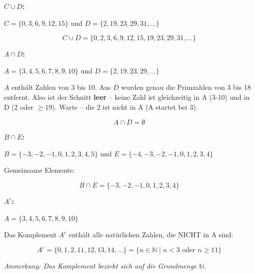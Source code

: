 \documentclass[12pt, a4paper]{article}
\begin{document}
\bigskip

\textbf{$C \cup D$:}

$C = \{0, 3, 6, 9, 12, 15\}$ und $D = \{2, 19, 23, 29, 31, \ldots\}$

\[
    \boxed{C \cup D = \{0, 2, 3, 6, 9, 12, 15, 19, 23, 29, 31, \ldots\}}
\]

\bigskip

\textbf{$A \cap D$:}

$A = \{3, 4, 5, 6, 7, 8, 9, 10\}$ und $D = \{2, 19, 23, 29, \ldots\}$

$A$ enthält Zahlen von 3 bis 10. Aus $D$ wurden genau die Primzahlen von 3 bis 18 entfernt. Also ist der Schnitt \textbf{leer} -- keine Zahl ist gleichzeitig in A (3-10) und in D (2 oder $\geq 19$). Warte -- die 2 ist nicht in A (A startet bei 3).

\[
    \boxed{A \cap D = \emptyset}
\]

\bigskip

\textbf{$B \cap E$:}

$B = \{-3, -2, -1, 0, 1, 2, 3, 4, 5\}$ und $E = \{-4, -3, -2, -1, 0, 1, 2, 3, 4\}$

Gemeinsame Elemente:

\[
    \boxed{B \cap E = \{-3, -2, -1, 0, 1, 2, 3, 4\}}
\]

\bigskip

\textbf{$A^c$:}

$A = \{3, 4, 5, 6, 7, 8, 9, 10\}$

Das Komplement $A^c$ enthält alle natürlichen Zahlen, die NICHT in A sind:

\[
    \boxed{A^c = \{0, 1, 2, 11, 12, 13, 14, \ldots\} = \{n \in \mathbb{N} \mid n < 3 \text{ oder } n \geq 11\}}
\]

\textit{Anmerkung: Das Komplement bezieht sich auf die Grundmenge $\mathbb{N}$.}
\end{document}

